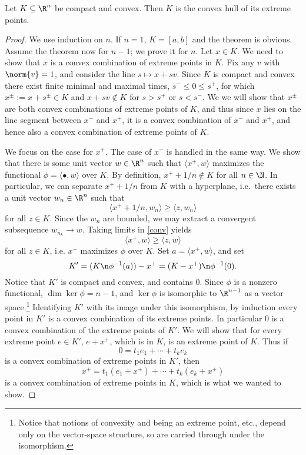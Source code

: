 \documentclass[12pt]{amsart}
\begin{document}
\begin{thm}\label{KM}Let $K \subseteq \R^n$ be compact and convex. Then $K$ is the convex hull of its extreme points.\end{thm}
\begin{proof}
We use induction on $n$. If $n = 1$, $K = [a,b]$ and the theorem is obvious. Assume the theorem now for $n-1$; we prove it for $n$. Let $x \in K$. We need to show that $x$ is a convex combination of extreme points in $K$. Fix any $v$ with $\norm{v} = 1$, and consider the line $s \mapsto x+sv$. Since $K$ is compact and convex there exist finite minimal and maximal times, $s^- \leq 0 \leq s^+$, for which $x^{\pm} := x+s^\pm \in K$ and $x+sv \not \in K$ for $s > s^+$ or $s < s^-$. We we will show that $x^{\pm}$ are both convex combinations of extreme points of $K$, and thus since $x$ lies on the line segment between $x^-$ and $x^+$, it is a convex combination of $x^-$ and $x^+$, and hence also a convex combination of extreme points of $K$.

We focus on the case for $x^+$. The case of $x^-$ is handled in the same way. We show that there is some unit vector $w \in \R^n$ such that $\langle x^+,w\rangle$ maximizes the functional $\phi = \langle \bullet,w\rangle$ over $K$. By definition, $x^++1/n \not \in K$ for all $n \in \N$. In particular, we can separate $x^++1/n$ from $K$ with a hyperplane, i.e.\ there exists a unit vector $w_n \in \R^n$ such that
\begin{equation}\label{conv}\langle x^++1/n,w_n \rangle \geq \langle z,w_n\rangle\end{equation}
for all $z \in K$. Since the $w_n$ are bounded, we may extract a convergent subsequence $w_{n_k} \to w$. Taking limits in \eqref{conv} yields
\[\langle x^+,w\rangle \geq\langle z,w\rangle\] for all $z \in K$, i.e. $x^+$ maximizes $\phi$ over $K$. 
Set $a = \langle x^+,w\rangle$, and set
\[K' = (K\n\phi^{-1}(a))-x^+ = (K-x^+)\n \phi^{-1}(0).\]
Notice that $K'$ is compact and convex, and contains $0$.
Since $\phi$ is a nonzero functional, $\dim \ker \phi = n-1$, and $\ker \phi$ is isomorphic to $\R^{n-1}$ as a vector space.\footnote{Notice that notions of convexity and being an extreme point, etc., depend only on the vector-space structure, so are carried through under the isomorphism.} Identifying $K'$ with its image under this isomorphism, by induction every point in $K'$ is a convex combination of its extreme points. In particular $0$ is a convex combination of the extreme points of $K'$. We will show that for every extreme point $e \in K'$, $e+x^+$, which is in $K$, is an extreme point of $K$. Thus if
\[0 = t_1e_1 + \cdots + t_ke_k\] is a convex combination of extreme points in $K'$, then
\[x^+ = t_1(e_1+x^+) + \cdots + t_k(e_k+x^+)\] is a convex combination of extreme points in $K$, which is what we wanted to show.


\end{proof}
\end{document}

